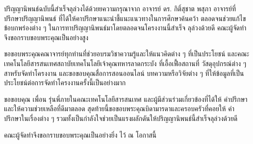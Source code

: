 ปริญญานิพนธ์ฉบับนี้สำเร็จลุล่วงได้ด้วยยความกรุณาจาก อาจารย์ ดร. กิติ์สุชาต พสุภา อาจารย์ที่ปรึกษาปริญญานิพนธ์ 
ที่ได้ให้คาปรึกษาแนะนำชี้แนะแนวทางในการศึกษาค้นคว้า ตลอดจนช่วยแก้ไขข้อบกพร่องต่าง ๆ ในการทาปริญญานิพนธ์มาโดยตลอดจนโครงงานนี้สำเร็จ ลุล่วงด้วยดี 
คณะผู้จัดทำจึงขอกราบขอบพระคุณเป็นอย่างสูง

ขอขอบพระคุณคณาจารย์ทุกท่านที่ช่วยอบรมวิชาความรู้และให้แนวคิดต่าง ๆ ที่เป็นประโยชน์ และคณะเทคโนโลยีสารสนเทศสถาบัยเทคโนโลยีเจ้าคุณทหารลาดกระบัง ที่เอื้อเฟื้อสถานที่ 
วัสดุอุปกรณ์ต่าง ๆ สาหรับจัดทำโครงงาน และขอขอบคุณสื่อการสอนออนไลน์ บทความหรือวิจัยต่าง ๆ ที่ให้ข้อมูลที่เป็นประโยชน์ต่อการจัดทำโครงงานครั้งนี้เป็นอย่างมาก

ขอขอบคุณ เพื่อน รุ่นพี่ภายในคณะเทคโนโลยีสารสนเทศ และผู้มีส่วนร่วมเกี่ยวข้องที่ได้ให้ คำปรึกษาและให้ความช่วยเหลือที่ดีมาตลอด สุดท้ายนี้ขอขอบพระคุณบิดามารดาและครอบครัวที่คอยให้ 
คำปรึกษาในเรื่องต่าง ๆ รวมทั้งเป็นกำลังใจช่วยเป็นแรงผลักดันให้ปริญญานิพนธ์นี้สำเร็จลุล่วงด้วยดี

คณะผู้จัดทำจึงขอกราบขอบพระคุณเป็นอย่างยิ่ง ไว้ ณ โอกาสนี้
